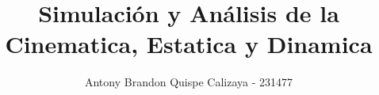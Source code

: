 \documentclass[12pt,letterpaper]{article}
\title{Simulación y Análisis de la Cinematica, Estatica y Dinamica}
\author{Antony Brandon Quispe Calizaya - 231477}
\date{}
\begin{document}
\renewcommand{\thesection}{\arabic{section}}

\setcounter{section}{0}

\maketitle

\newpage







\end{document}
